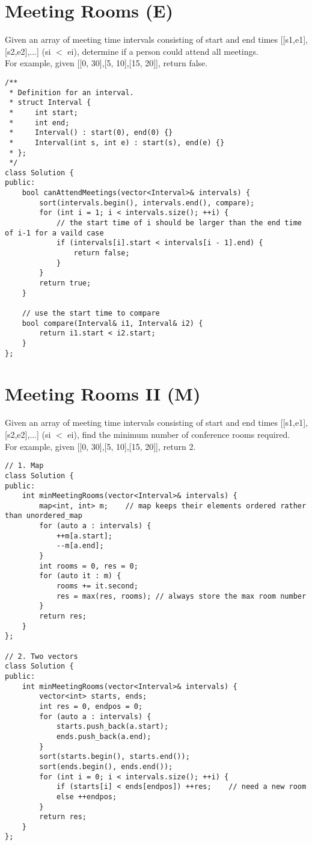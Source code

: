 \section{Meeting Rooms (E)}
Given an array of meeting time intervals consisting of start and end times [[s1,e1],[s2,e2],...] (si $<$ ei), determine if a person could attend all meetings.\\

For example, given [[0, 30],[5, 10],[15, 20]], return false.\\

\begin{lstlisting}
/** 
 * Definition for an interval. 
 * struct Interval { 
 *     int start; 
 *     int end; 
 *     Interval() : start(0), end(0) {} 
 *     Interval(int s, int e) : start(s), end(e) {} 
 * }; 
 */
class Solution {
public:
    bool canAttendMeetings(vector<Interval>& intervals) {
        sort(intervals.begin(), intervals.end(), compare);
        for (int i = 1; i < intervals.size(); ++i) {
            // the start time of i should be larger than the end time of i-1 for a vaild case
            if (intervals[i].start < intervals[i - 1].end) {
                return false;
            }
        }
        return true;
    }
    
    // use the start time to compare
    bool compare(Interval& i1, Interval& i2) {
        return i1.start < i2.start;
    }
};
\end{lstlisting}


\section{Meeting Rooms II (M)}
Given an array of meeting time intervals consisting of start and end times [[s1,e1],[s2,e2],...] (si $<$ ei), find the minimum number of conference rooms required.\\

For example, given [[0, 30],[5, 10],[15, 20]], return 2.\\

\begin{lstlisting}
// 1. Map
class Solution {
public:
    int minMeetingRooms(vector<Interval>& intervals) {
        map<int, int> m;    // map keeps their elements ordered rather than unordered_map
        for (auto a : intervals) {
            ++m[a.start];
            --m[a.end];
        }
        int rooms = 0, res = 0;
        for (auto it : m) {
            rooms += it.second;
            res = max(res, rooms); // always store the max room number
        }
        return res;
    }
};

// 2. Two vectors
class Solution {
public:
    int minMeetingRooms(vector<Interval>& intervals) {
        vector<int> starts, ends;
        int res = 0, endpos = 0;
        for (auto a : intervals) {
            starts.push_back(a.start);
            ends.push_back(a.end);
        }
        sort(starts.begin(), starts.end());
        sort(ends.begin(), ends.end());
        for (int i = 0; i < intervals.size(); ++i) {
            if (starts[i] < ends[endpos]) ++res;    // need a new room
            else ++endpos;
        }
        return res;
    }
};
\end{lstlisting}


